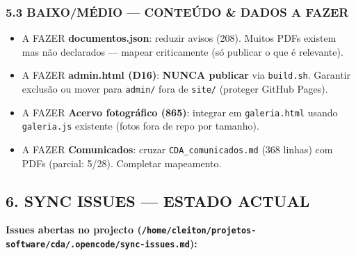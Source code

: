 \subsubsection{\texorpdfstring{5.3 BAIXO/MÉDIO --- CONTEÚDO \& DADOS {A
FAZER}}{5.3 BAIXO/MÉDIO --- CONTEÚDO \& DADOS A FAZER}}\label{baixomuxe9dio-conteuxfado-dados-a-fazer}

\begin{itemize}
\tightlist
\item
  {A FAZER} \textbf{documentos.json}: reduzir avisos (208). Muitos PDFs
  existem mas não declarados --- mapear criticamente (só publicar o que
  é relevante).
\item
  {A FAZER} \textbf{admin.html (D16)}: \textbf{NUNCA publicar} via
  \texttt{build.sh}. Garantir exclusão ou mover para \texttt{admin/}
  fora de \texttt{site/} (proteger GitHub Pages).
\item
  {A FAZER} \textbf{Acervo fotográfico (865)}: integrar em
  \texttt{galeria.html} usando \texttt{galeria.js} existente (fotos fora
  de repo por tamanho).
\item
  {A FAZER} \textbf{Comunicados}: cruzar \texttt{CDA\_comunicados.md}
  (368 linhas) com PDFs (parcial: 5/28). Completar mapeamento.
\end{itemize}

\subsection{6. SYNC ISSUES --- ESTADO
ACTUAL}\label{sync-issues-estado-actual}

\textbf{Issues abertas no projecto
(\texttt{/home/cleiton/projetos-software/cda/.opencode/sync-issues.md}):}

